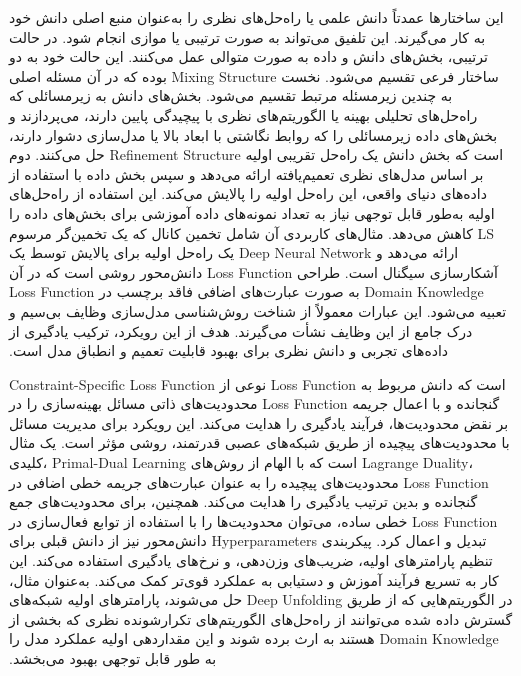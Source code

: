 این ساختارها عمدتاً دانش علمی یا راه‌حل‌های نظری را به‌عنوان منبع اصلی دانش خود به کار می‌گیرند. این تلفیق می‌تواند به صورت ترتیبی یا موازی انجام شود.‬
در حالت ترتیبی، بخش‌های دانش و داده به صورت متوالی عمل می‌کنند. این حالت خود به دو ساختار فرعی تقسیم می‌شود.‬‫ نخست 
\gls{Mixing Structure}
 بوده که در آن مسئله اصلی به چندین زیرمسئله مرتبط تقسیم می‌شود. بخش‌های دانش به زیرمسائلی که راه‌حل‌های تحلیلی بهینه یا الگوریتم‌های نظری با پیچیدگی پایین دارند، می‌پردازند و بخش‌های داده زیرمسائلی را که روابط نگاشتی با ابعاد بالا یا مدل‌سازی دشوار دارند، حل می‌کنند.‬
دوم 
\gls{Refinement Structure}
است که بخش دانش یک راه‌حل تقریبی اولیه بر اساس مدل‌های نظری تعمیم‌یافته ارائه می‌دهد و سپس بخش داده با استفاده از داده‌های دنیای واقعی، این راه‌حل اولیه را پالایش می‌کند. این استفاده از راه‌حل‌های اولیه به‌طور قابل توجهی نیاز به تعداد نمونه‌های داده آموزشی برای بخش‌های داده را کاهش می‌دهد. مثال‌های کاربردی آن شامل تخمین کانال که یک تخمین‌گر مرسوم 
\gls{LS}
 یک راه‌حل اولیه برای پالایش توسط یک 
\gls{Deep Neural Network}
  ارائه می‌دهد و آشکارسازی سیگنال است.‬
‫طراحی 
\gls{Loss Function}
 دانش‌محور روشی است که در آن 
\gls{Domain Knowledge}
  به صورت عبارت‌های اضافی فاقد برچسب در 
\gls{Loss Function}
   تعبیه می‌شود. این عبارات معمولاً از شناخت روش‌شناسی مدل‌سازی وظایف بی‌سیم و درک جامع از این وظایف نشأت می‌گیرند. هدف از این رویکرد، ترکیب یادگیری از داده‌های تجربی و دانش نظری برای بهبود قابلیت تعمیم و انطباق مدل است.‬
   
\gls{Constraint-Specific Loss Function}
نوعی از 
\gls{Loss Function}
است که دانش مربوط به محدودیت‌های ذاتی مسائل بهینه‌سازی را در 
\gls{Loss Function}
 گنجانده و با اعمال جریمه بر نقض محدودیت‌ها، فرآیند یادگیری را هدایت می‌کند. این رویکرد برای مدیریت مسائل با محدودیت‌های پیچیده از طریق شبکه‌های عصبی قدرتمند، روشی مؤثر است. یک مثال کلیدی، 
\gls{Primal-Dual Learning}
  است که با الهام از روش‌های 
\gls{Lagrange Duality}،
   محدودیت‌های پیچیده را به عنوان عبارت‌های جریمه خطی اضافی در 
\gls{Loss Function}
    گنجانده و بدین ترتیب یادگیری را هدایت می‌کند. همچنین، برای محدودیت‌های جمع خطی ساده، می‌توان محدودیت‌ها را با استفاده از توابع فعال‌سازی در 
\gls{Loss Function}
     تبدیل و اعمال کرد.‬
‫پیکربندی 
\glspl{Hyperparameter}
 دانش‌محور نیز از دانش قبلی برای تنظیم پارامترهای اولیه، ضریب‌های وزن‌دهی، و نرخ‌های یادگیری استفاده می‌کند. این کار به تسریع فرآیند آموزش و دستیابی به عملکرد قوی‌تر کمک می‌کند. به‌عنوان مثال، در الگوریتم‌هایی که از طریق 
\gls{Deep Unfolding}
  حل می‌شوند، پارامترهای اولیه شبکه‌های گسترش داده شده می‌توانند از راه‌حل‌های الگوریتم‌های تکرارشونده نظری که بخشی از 
\gls{Domain Knowledge}
  هستند به ارث برده شوند و این مقداردهی اولیه عملکرد مدل را به طور قابل توجهی بهبود می‌بخشد.‬

